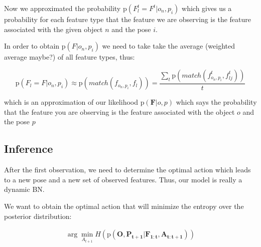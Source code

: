 \documentclass[11pt]{article}
\newcommand{\SetOf}[1]{\mathbf{#1}} %
\newcommand{\prob}[1]{\text{p}(#1)} %
\newcommand{\Eq}[1]{\begin{align*}#1\end{align*}} %
\begin{document}
	Now we approximated the probability $\prob{F_l^t = F^t|o_n,p_i}$ which gives us a probability for each feature type that the feature we are observing is the feature associated with the given object $n$ and the pose $i$. 

	In order to obtain $\prob{F|o_n,p_i}$ we need to take take the average (weighted average maybe?) of all feature types, thus:

	\[
	\prob{F_l = F|o_n,p_i} \approx \prob{match(f_{o_n,p_i},f_{l})} = \frac{\sum\limits_t \prob{match(f^t_{o_n,p_i},f^t_{lj})}} {t}
	\]

	which is an approximation of our likelihood $\prob{\SetOf{F}|o,p}$ which says the probability that the feature you are observing is the feature associated with the object $o$ and the pose $p$
\subsection{Inference}

	After the first observation, we need to determine the optimal action which leads to a new pose and a new set of observed features. Thus, our model is really a dynamic BN. 

	\begin{center}
	\end{center}


	We want to obtain the optimal action that will minimize the entropy over the posterior
	distribution:

	\Eq{  \arg\!\min_{A_{t+1}} H(\prob{\SetOf{O},\SetOf{P_{t+1}}|\SetOf{F_{1:t}},\SetOf{A_{t:t+1}}})}
\end{document}
